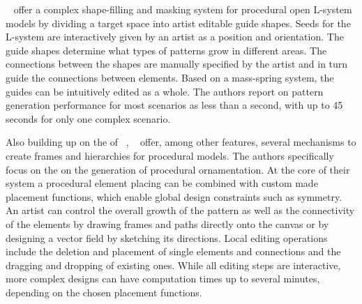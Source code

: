 \citeauthor*{benes_2011_gpm}~\cite{benes_2011_gpm} offer a complex shape-filling and masking system for procedural open L-system models by dividing a target space into artist editable guide shapes. Seeds for the L-system are interactively given by an artist as a position and orientation. The guide shapes determine what types of patterns grow in different areas. The connections between the shapes are manually specified by the artist and in turn guide the connections between elements. Based on a mass-spring system, the guides can be intuitively edited as a whole. The authors report on pattern generation performance for most scenarios as less than a second, with up to 45 seconds for only one complex scenario.

Also building up on the of \citeauthor*{wong_1998_cgf}~\cite{wong_1998_cgf}, \citeauthor*{gieseke_2017_ooo}~\cite{gieseke_2017_ooo} offer, among other features, several mechanisms to create frames and hierarchies for procedural models. The authors specifically focus on the on the generation of procedural ornamentation. At the core of their system a procedural element placing can be combined with custom made placement functions, which enable global design constraints such as symmetry. An artist can control the overall growth of the pattern as well as the connectivity of the elements by drawing frames and paths directly onto the canvas or by designing a vector field by sketching its directions. Local editing operations include the deletion and placement of single elements and connections and the dragging and dropping of existing ones. While all editing steps are interactive, more complex designs can have computation times up to several minutes, depending on the chosen placement functions.

